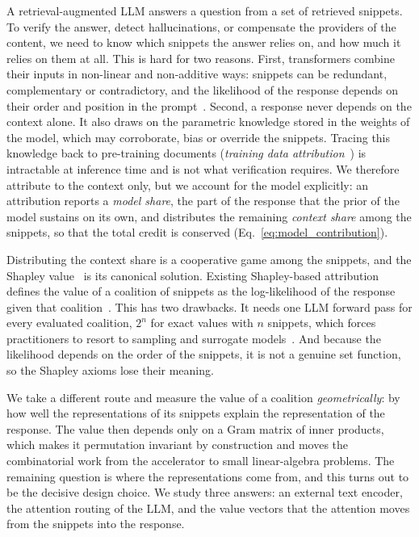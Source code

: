 \documentclass{article}
\begin{document}
A retrieval-augmented LLM answers a question from a set of retrieved snippets. To verify the answer, detect hallucinations, or compensate the providers of the content, we need to know which snippets the answer relies on, and how much it relies on them at all. This is hard for two reasons. First, transformers combine their inputs in non-linear and non-additive ways: snippets can be redundant, complementary or contradictory, and the likelihood of the response depends on their order and position in the prompt~\cite{liu2024lost}. Second, a response never depends on the context alone. It also draws on the parametric knowledge stored in the weights of the model, which may corroborate, bias or override the snippets. Tracing this knowledge back to pre-training documents (\emph{training data attribution}~\cite{koh2017understanding}) is intractable at inference time and is not what verification requires. We therefore attribute to the context only, but we account for the model explicitly: an attribution reports a \emph{model share}, the part of the response that the prior of the model sustains on its own, and distributes the remaining \emph{context share} among the snippets, so that the total credit is conserved (Eq.~\eqref{eq:model_contribution}).

Distributing the context share is a cooperative game among the snippets, and the Shapley value~\cite{shapley1953value} is its canonical solution. Existing Shapley-based attribution defines the value of a coalition of snippets as the log-likelihood of the response given that coalition~\cite{nematov2025source}. This has two drawbacks. It needs one LLM forward pass for every evaluated coalition, $2^n$ for exact values with $n$ snippets, which forces practitioners to resort to sampling and surrogate models~\cite{lundberg2017unified, cohen2024contextcite}. And because the likelihood depends on the order of the snippets, it is not a genuine set function, so the Shapley axioms lose their meaning.

We take a different route and measure the value of a coalition \emph{geometrically}: by how well the representations of its snippets explain the representation of the response. The value then depends only on a Gram matrix of inner products, which makes it permutation invariant by construction and moves the combinatorial work from the accelerator to small linear-algebra problems. The remaining question is where the representations come from, and this turns out to be the decisive design choice. We study three answers: an external text encoder, the attention routing of the LLM, and the value vectors that the attention moves from the snippets into the response.
\end{document}
